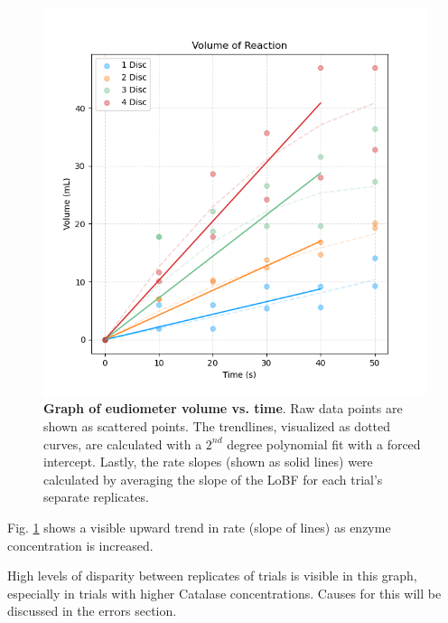\documentclass[prl,twocolumn,amsmath,amssymb,superscriptaddress]{revtex4-2}
\begin{document}
\begin{figure}[htb]
    \includegraphics[width=1\linewidth]{Volume.png}
    \caption{\textbf{Graph of eudiometer volume vs. time}. Raw data points are shown as scattered points. The trendlines, visualized as dotted curves, are calculated with a $2^{nd}$ degree polynomial fit with a forced intercept. Lastly, the rate slopes (shown as solid lines) were calculated by averaging the slope of the LoBF for each trial's separate replicates.}
    \label{fig:Volume}
\end{figure}

Fig. \ref{fig:Volume} shows a visible upward trend in rate (slope of lines) as enzyme concentration is increased.

High levels of disparity between replicates of trials is visible in this graph, especially in trials with higher Catalase concentrations. Causes for this will be discussed in the errors section.
\end{document}
